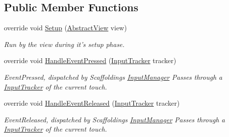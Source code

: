 \subsection*{Public Member Functions}
\begin{DoxyCompactItemize}
\item 
override void \hyperlink{class_scaffolding_1_1_pinch_this_input_a60b5bc5461de1286d8bd142742451dab}{Setup} (\hyperlink{class_scaffolding_1_1_abstract_view}{Abstract\+View} view)
\begin{DoxyCompactList}\small\item\em Run by the view during it's setup phase. \end{DoxyCompactList}\item 
override void \hyperlink{class_scaffolding_1_1_pinch_this_input_a00f941bc53b1847a2be7a2e61a4a9a57}{Handle\+Event\+Pressed} (\hyperlink{class_scaffolding_1_1_input_tracker}{Input\+Tracker} tracker)
\begin{DoxyCompactList}\small\item\em Event\+Pressed, dispatched by Scaffoldings \hyperlink{class_scaffolding_1_1_input_manager}{Input\+Manager} Passes through a \hyperlink{class_scaffolding_1_1_input_tracker}{Input\+Tracker} of the current touch. \end{DoxyCompactList}\item 
override void \hyperlink{class_scaffolding_1_1_pinch_this_input_ad9ca7c0e4b14d3d59ff06b258b4b9f7d}{Handle\+Event\+Released} (\hyperlink{class_scaffolding_1_1_input_tracker}{Input\+Tracker} tracker)
\begin{DoxyCompactList}\small\item\em Event\+Released, dispatched by Scaffoldings \hyperlink{class_scaffolding_1_1_input_manager}{Input\+Manager} Passes through a \hyperlink{class_scaffolding_1_1_input_tracker}{Input\+Tracker} of the current touch. \end{DoxyCompactList}\end{DoxyCompactItemize}
